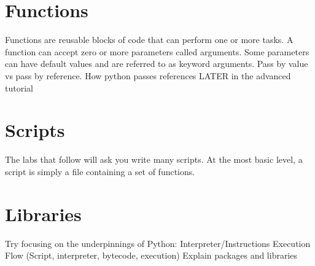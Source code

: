 \section*{Functions}
Functions are reusable blocks of code that can perform one or more tasks.  A function can accept zero or more parameters called arguments.  Some parameters can have default values and are referred to as keyword arguments.
Pass by value vs pass by reference.  How python passes references LATER in the advanced tutorial

\section*{Scripts}
The labs that follow will ask you write many scripts.  At the most basic level, a script is simply a file containing a set of functions.

\section*{Libraries}


Try focusing on the underpinnings of Python:
Interpreter/Instructions
Execution Flow (Script, interpreter, bytecode, execution)
Explain packages and libraries
